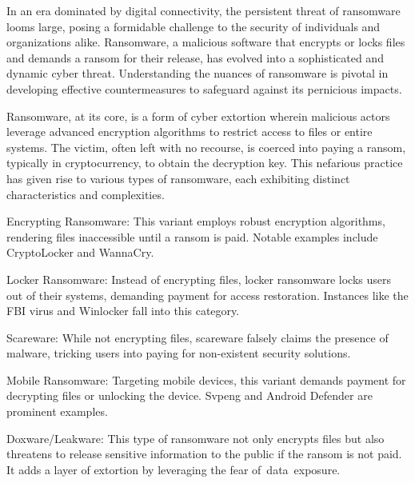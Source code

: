 \documentclass[12pt,twocolumn]{article}
\begin{document}
    In an era dominated by digital connectivity, the persistent threat of ransomware looms large, posing a formidable challenge to the security of individuals and organizations alike. Ransomware, a malicious software that encrypts or locks files and demands a ransom for their release, has evolved into a sophisticated and dynamic cyber threat. Understanding the nuances of ransomware is pivotal in developing effective countermeasures to safeguard against its pernicious impacts.

    Ransomware, at its core, is a form of cyber extortion wherein malicious actors leverage advanced encryption algorithms to restrict access to files or entire systems. The victim, often left with no recourse, is coerced into paying a ransom, typically in cryptocurrency, to obtain the decryption key. This nefarious practice has given rise to various types of ransomware, each exhibiting distinct characteristics and complexities.
    
    {Encrypting Ransomware:} This variant employs robust encryption algorithms, rendering files inaccessible until a ransom is paid. Notable examples include CryptoLocker and WannaCry.

    {Locker Ransomware:} Instead of encrypting files, locker ransomware locks users out of their systems, demanding payment for access restoration. Instances like the FBI virus and Winlocker fall into this category.

    {Scareware:} While not encrypting files, scareware falsely claims the presence of malware, tricking users into paying for non-existent security solutions.

    {Mobile Ransomware:} Targeting mobile devices, this variant demands payment for decrypting files or unlocking the device. Svpeng and Android Defender are prominent examples.
    
    {Doxware/Leakware:} This type of ransomware not only encrypts files but also threatens to release sensitive information to the public if the ransom is not paid. It adds a layer of extortion by leveraging the fear of data exposure.
    
\end{document}
